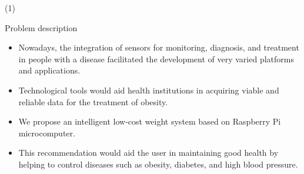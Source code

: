 
\begin{frame}{ \footnotemark (1)}
\begin{block}{Problem description} 



	\begin{itemize}
	\item Nowadays, the integration of sensors for monitoring, diagnosis, and treatment in people with a disease facilitated the development of very varied platforms and applications. 
    \item Technological tools would aid health institutions in acquiring viable and reliable data for the treatment of obesity. 
    \item We propose an intelligent low-cost weight system based on Raspberry Pi microcomputer. 
\item This recommendation would aid the user in maintaining good health by helping to control diseases such as obesity, diabetes, and high blood pressure.
	\end{itemize}
\end{block} 
\setcounter{footnote}{0}
\end{frame}


